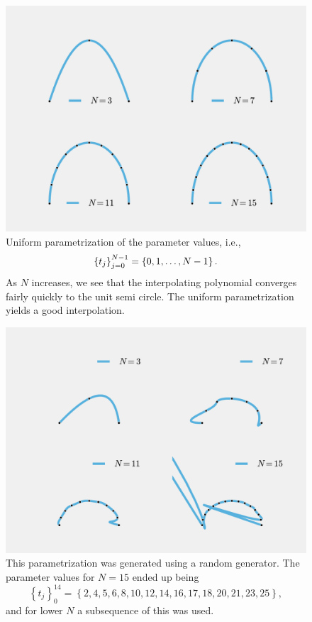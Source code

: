 \documentclass{article}
\begin{document}
    \begin{figure}[htbp]
        \centering
        \includegraphics[width=0.8\linewidth]{uniform.pdf}
        \caption{Uniform parametrization of the parameter values, i.e.,
    \begin{equation}
        \notag
        \left\{ t_j \right\}_{j=0}^{N-1} = \left\{ 0, 1, \ldots, N-1 \right\}.
    \end{equation}
    As $N$ increases, we see that the interpolating polynomial converges fairly
quickly to the unit semi circle. The uniform parametrization yields a good
interpolation.}
        \label{fig:uniform}
    \end{figure}
    
    \begin{figure}[htpb]
        \centering
        \includegraphics[width=0.8\linewidth]{random.pdf}
        \caption{This parametrization was generated using a random generator.
            The parameter values for $N = 15$ ended up being
            $$\left\{t_j\right\}_{0}^{14} = \left\{2, 4,  5,  6,
            8, 10, 12, 14, 16, 17, 18, 20, 21, 23, 25\right\},$$ and for lower $N$ a
        subsequence of this was used.}
        \label{fig:random}
    \end{figure}
\end{document}
